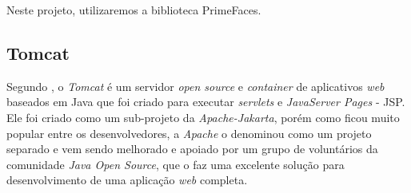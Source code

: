  \par Neste projeto, utilizaremos a biblioteca PrimeFaces.
 



\subsection{Tomcat}

\par Segundo , o \textit{Tomcat} é um
servidor \textit{open source} e \textit{container} de aplicativos \textit{web}
baseados em Java que foi criado para executar \textit{servlets} e \textit{JavaServer
Pages} - JSP\footnotemark[4].
Ele foi criado como um sub-projeto da \textit{Apache-Jakarta}, porém como ficou
muito popular entre os desenvolvedores, a \textit{Apache} o denominou como um
projeto separado e vem sendo melhorado e apoiado por um grupo de voluntários da comunidade \textit{Java Open
Source}, que o faz uma excelente solução para desenvolvimento de uma aplicação
\textit{web} completa. 




